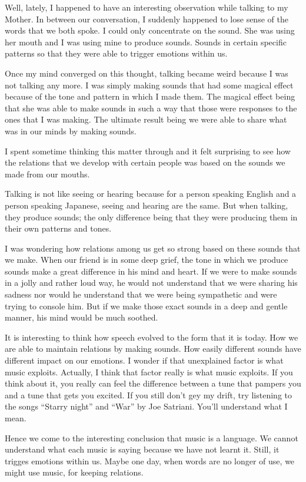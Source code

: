 \documentclass[twoside,11pt,titlepage]{article}
\begin{document}
Well, lately, I happened to have an interesting observation while talking to my Mother. In between our conversation, I suddenly happened to lose sense of the words that we both spoke. I could only concentrate on the sound. She was using her mouth and I was using mine to produce sounds. Sounds in certain specific patterns so that they were able to trigger emotions within us.

Once my mind converged on this thought, talking became weird because I was not talking any more. I was simply making sounds that had some magical effect because of the tone and pattern in which I made them. The magical effect being that she was able to make sounds in such a way that those were responses to the ones that I was making. The ultimate result being we were able to share what was in our minds by making sounds.

I spent sometime thinking this matter through and it felt surprising to see how the relations that we develop with certain people was based on the sounds we made from our mouths.

Talking is not like seeing or hearing because for a person speaking English and a person speaking Japanese, seeing and hearing are the same. But when talking, they produce sounds; the only difference being that they were producing them in their own patterns and tones.

I was wondering how relations among us get so strong based on these sounds that we make. When our friend is in some deep grief, the tone in which we produce sounds make a great difference in his mind and heart. If we were to make sounds in a jolly and rather loud way, he would not understand that we were sharing his sadness nor would he understand that we were being sympathetic and were trying to console him. But if we make those exact sounds in a deep and gentle manner, his mind would be much soothed.

It is interesting to think how speech evolved to the form that it is today. How we are able to maintain relations by making sounds. How easily different sounds have different impact on our emotions. I wonder if that unexplained factor is what music exploits. Actually, I think that factor really is what music exploits. If you think about it, you really can feel the difference between a tune that pampers you and a tune that gets you excited. If you still don't gey my drift, try listening to the songs ``Starry night'' and ``War'' by Joe Satriani. You'll understand what I mean.

Hence we come to the interesting conclusion that music is a language. We cannot understand what each music is saying because we have not learnt it. Still, it trigges emotions within us. Maybe one day, when words are no longer of use, we might use music, for keeping relations.
\end{document}
